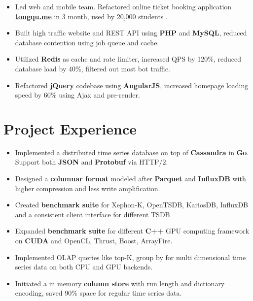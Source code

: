 \documentclass{simple-cv}
\begin{document}
\begin{itemize}
  \item Led web and mobile team. Refactored online ticket booking application \href{https://tongqu.me}{\textbf{tongqu.me}} in 3 month, used by 20,000 students .
  \item Built high traffic website and REST API using \textbf{PHP} and \textbf{MySQL}, reduced database contention using job queue and cache.
  \item Utilized \textbf{Redis} as cache and rate limiter, increased QPS by 120\%, reduced database load by 40\%, filtered out most bot traffic.
  \item Refactored \textbf{jQuery} codebase using \textbf{AngularJS}, increased homepage loading speed by 60\% using Ajax and pre-render.
\end{itemize}

\section{Project Experience}



\begin{itemize}
  \item Implemented a distributed time series database on top of \textbf{Cassandra} in \textbf{Go}. Support both \textbf{JSON} and \textbf{Protobuf} via HTTP/2.
  \item Designed a \textbf{columnar format} modeled after \textbf{Parquet} and \textbf{InfluxDB} with higher compression and less write amplification.
  \item Created \textbf{benchmark suite} for Xephon-K, OpenTSDB, KariosDB, InfluxDB and a consistent client interface for different TSDB.
\end{itemize}


\begin{itemize}
  \item Expanded \textbf{benchmark suite} for different \textbf{C++} GPU computing framework on \textbf{CUDA} and OpenCL, Thrust, Boost, ArrayFire.
  \item Implemented OLAP queries like top-K, group by for multi dimensional time series data on both CPU and GPU backends.
  \item Initiated a in memory \textbf{column store} with run length and dictionary encoding, saved 90\% space for regular time series data.
\end{itemize}
\end{document}
